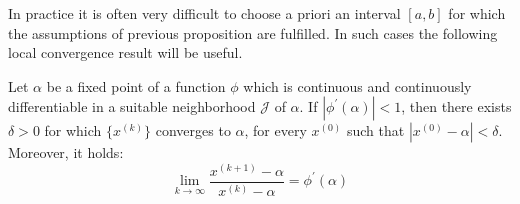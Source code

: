 \documentclass[12pt, a4paper]{report}
\begin{document}
    In practice it is often very difficult to choose a priori an interval $[a,b]$ for which the assumptions of previous proposition are fulfilled. In such cases the following local
    convergence result will be useful. 
    \begin{theorem}
        Let $\alpha$ be a fixed point of a function $\phi$ which is continuous and continuously differentiable in a suitable neighborhood $\mathcal{J}$ of $\alpha$. If 
        $\left\lvert \phi^{'}(\alpha) \right\rvert < 1$, then there exists $\delta > 0$ for which $\{x^{(k)}\}$ converges to $\alpha$, for every $x^{(0)}$ such that 
        $\left\lvert x^{(0)}-\alpha \right\rvert < \delta$. Moreover, it holds: 
        \[\lim_{k \rightarrow \infty}\dfrac{x^{(k+1)}-\alpha}{x^{(k)}-\alpha}=\phi^{'}(\alpha)\]
    \end{theorem}
\end{document}
